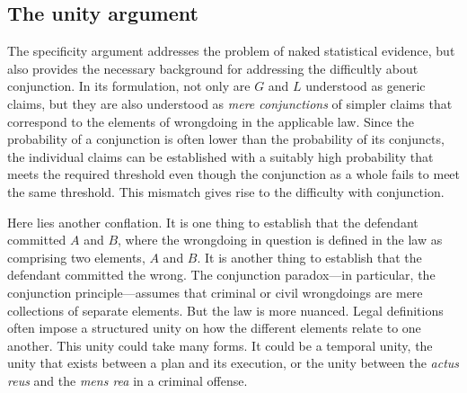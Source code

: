 \documentclass[
  10pt,
  dvipsnames,enabledeprecatedfontcommands]{scrartcl}
\begin{document}
\hypertarget{the-unity-argument}{%
\subsection{The unity argument}\label{the-unity-argument}}

The specificity argument addresses the problem of naked statistical
evidence, but also provides the necessary background for addressing the
difficultly about conjunction. In its formulation, not only are \(G\)
and \(L\) understood as generic claims, but they are also understood as
\emph{mere conjunctions} of simpler claims that correspond to the
elements of wrongdoing in the applicable law. Since the probability of a
conjunction is often lower than the probability of its conjuncts, the
individual claims can be established with a suitably high probability
that meets the required threshold even though the conjunction as a whole
fails to meet the same threshold. This mismatch gives rise to the
difficulty with conjunction.

Here lies another conflation. It is one thing to establish that the
defendant committed \(A\) and \(B\), where the wrongdoing in question is
defined in the law as comprising two elements, \(A\) and \(B\). It is
another thing to establish that the defendant committed the wrong. The
conjunction paradox---in particular, the conjunction principle---assumes
that criminal or civil wrongdoings are mere collections of separate
elements. But the law is more nuanced. Legal definitions often impose a
structured unity on how the different elements relate to one another.
This unity could take many forms. It could be a temporal unity, the
unity that exists between a plan and its execution, or the unity between
the \textit{actus reus} and the \textit{mens rea} in a criminal offense.
\end{document}
